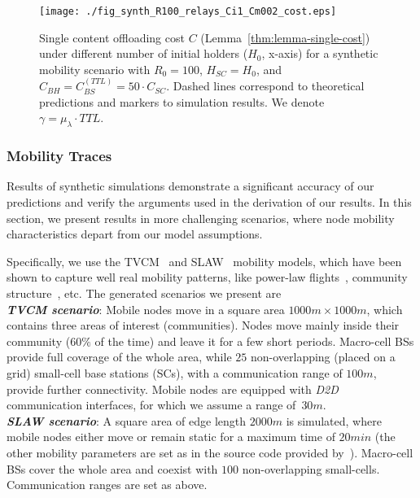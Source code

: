 \documentclass[10pt,conference,letterpaper]{IEEEtran}
\begin{document}
\begin{figure}
\centering
{\texttt{[image: ./fig\_synth\_R100\_relays\_Ci1\_Cm002\_cost.eps]}\label{fig:cost-single-synth}}
\caption{Single content offloading cost $C$ (Lemma~\ref{thm:lemma-single-cost}) under different number of initial holders ($H_{0}$, x-axis) for a synthetic mobility scenario with $R_{0}=100$, $H_{SC}=H_{0}$, and $C_{BH}=C_{BS}^{(TTL)}=50 \cdot C_{SC}$. Dashed lines correspond to theoretical predictions and markers to simulation results. We denote $\gamma = \mu_{\lambda}\cdot TTL$.}
\label{fig:cost-single-synthetic}
\end{figure}





\subsubsection{Mobility Traces}


Results of synthetic simulations demonstrate a significant accuracy of our predictions and verify the arguments used in the derivation of our results. In this section, we present results in more challenging scenarios, where node mobility characteristics depart from our model assumptions.

Specifically, we use the TVCM~\cite{tvcm} and SLAW~\cite{slaw} mobility models, which have been shown to capture well real mobility patterns, like power-law flights~\cite{slaw}, community structure~\cite{tvcm}, etc. The generated scenarios we present are\\
\noindent\textit{\textbf{TVCM scenario}}: Mobile nodes move in a square area $1000m\times1000m$, which contains three areas of interest (communities). Nodes move mainly inside their community ($60\%$ of the time) and leave it for a few short periods. Macro-cell BSs provide full coverage of the whole area, while $25$ non-overlapping (placed on a grid) small-cell base stations (SCs), with a communication range of $100m$, provide further connectivity. Mobile nodes are equipped with \textit{D2D} communication interfaces, for which we assume a range of~$30m$.\\
\textit{\textbf{SLAW scenario}}: A square area of edge length $2000m$ is simulated, where mobile nodes either move or remain static for a maximum time of $20min$ (the other mobility parameters are set as in the source code provided by~\cite{slaw}). Macro-cell BSs cover the whole area and coexist with $100$ non-overlapping small-cells. Communication ranges are set as above.
\end{document}
